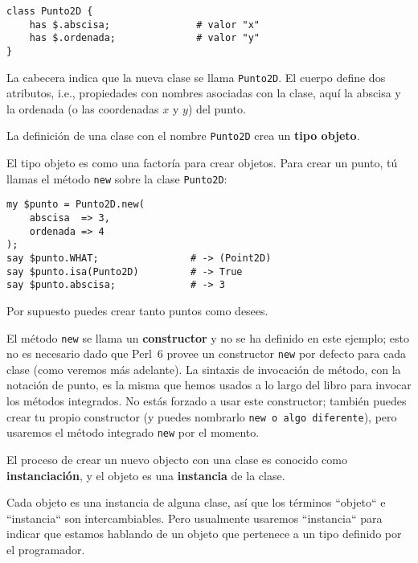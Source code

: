 \begin{verbatim}
class Punto2D {
    has $.abscisa;               # valor "x"
    has $.ordenada;              # valor "y" 
}
\end{verbatim}
%
La cabecera indica que la nueva clase se llama {\tt Punto2D}. 
El cuerpo define dos atributos, i.e., propiedades con nombres
asociadas con la clase, aquí la abscisa y la ordenada 
(o las coordenadas $x$ y $y$) del punto.

La definición de una clase con el nombre {\tt Punto2D} crea
un {\bf tipo objeto}.

El tipo objeto es como una factoría para crear objetos. Para crear
un punto, tú llamas el método {\tt new} sobre la clase {\tt Punto2D}:

\begin{verbatim}
my $punto = Punto2D.new( 
    abscisa  => 3, 
    ordenada => 4
);
say $punto.WHAT;                # -> (Point2D)
say $punto.isa(Punto2D)         # -> True
say $punto.abscisa;             # -> 3
\end{verbatim}
%
Por supuesto puedes crear tanto puntos como desees.

El método {\tt new} se llama un {\bf constructor} y no se ha 
definido en este ejemplo; esto no es necesario dado que 
Perl~6 provee un constructor {\tt new} por defecto para 
cada clase (como veremos más adelante). La sintaxis de invocación
de método, con la notación de punto, es la misma que hemos 
usados a lo largo del libro para invocar los métodos integrados.
No estás forzado a usar este constructor; también puedes crear
tu propio constructor (y puedes nombrarlo {\tt new o algo diferente}),
pero usaremos el método integrado {\tt new} por el momento.

El proceso de crear un nuevo objecto con una clase es conocido
como {\bf instanciación}, y el objeto es una {\bf instancia} de la
clase.

Cada objeto es una instancia de alguna clase, 
así que los términos ``objeto`` e ``instancia`` son
intercambiables. Pero usualmente usaremos ``instancia``
para indicar que estamos hablando de un objeto que pertenece
a un tipo definido por el programador.

